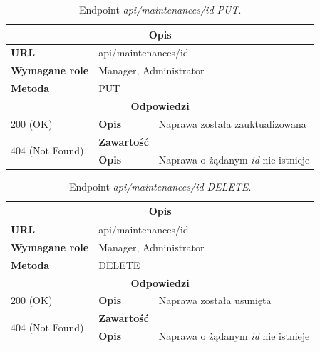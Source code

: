 \documentclass[eng,printmode,openany]{mgr}
\begin{document}
\begin{table}[H]
	\caption{Endpoint \textit{api/maintenances/id PUT}.}
	\begin{tabularx}{\textwidth}{|l|l|X|}
		\hline
		\multicolumn{3}{|c|}{\textbf{\textbf{Opis}}}
		\\ \hline
		\textbf{URL}                       & \multicolumn{2}{l|}{api/maintenances/id}
		\\ \hline
		\textbf{Wymagane role}             & \multicolumn{2}{l|}{Manager, Administrator}
		\\ \hline
		\textbf{Metoda}                    & \multicolumn{2}{l|}{PUT}
		\\ \hline
		\multicolumn{3}{|c|}{\textbf{Odpowiedzi}}
		\\ \hline
		200 (OK) 		                        & \textbf{Opis}      	& Naprawa została zauktualizowana
		\\ \hline
		\multirow{2}{*}{404 (Not Found)} 	    & \textbf{Zawartość}     & 
		\\ \cline{2-3}                          & \textbf{Opis}          & Naprawa o żądanym \textit{id} nie istnieje
		\\ \hline
	\end{tabularx}
\end{table}

\begin{table}[H]
	\caption{Endpoint \textit{api/maintenances/id DELETE}.}
	\begin{tabularx}{\textwidth}{|l|l|X|}
		\hline
		\multicolumn{3}{|c|}{\textbf{\textbf{Opis}}}
		\\ \hline
		\textbf{URL}                       & \multicolumn{2}{l|}{api/maintenances/id}
		\\ \hline
		\textbf{Wymagane role}             & \multicolumn{2}{l|}{Manager, Administrator}
		\\ \hline
		\textbf{Metoda}                    & \multicolumn{2}{l|}{DELETE}
		\\ \hline
		\multicolumn{3}{|c|}{\textbf{Odpowiedzi}}
		\\ \hline
		200 (OK)			                & \textbf{Opis}         	& Naprawa została usunięta
		\\ \hline
		\multirow{2}{*}{404 (Not Found)} 	& \textbf{Zawartość}     & 
		\\ \cline{2-3}                      & \textbf{Opis}          & Naprawa o żądanym \textit{id} nie istnieje
		\\ \hline
	\end{tabularx}
\end{table}
\end{document}
